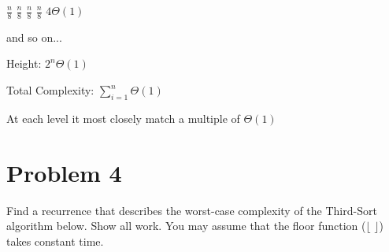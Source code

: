 \documentclass[12pt, letterpaper]{article}
\begin{document}
$\frac{n}{8}$ $\frac{n}{8}$ $\frac{n}{8}$ $\frac{n}{8}$ \hspace*{6mm}$4\Theta(1)$

and so on...

Height: $2^n\Theta(1)$

Total Complexity: $\sum_{i=1}^{n}\Theta(1)$

At each level it most closely match a multiple of $\Theta(1)$

\section*{Problem 4}

Find a recurrence that describes the worst-case complexity of the Third-Sort algorithm below.  Show all work.
You may assume that the floor function ($\lfloor$ $\rfloor$) takes constant time.
\end{document}
